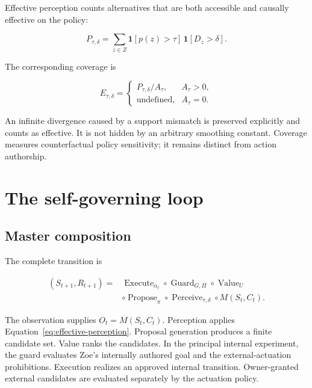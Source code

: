 \documentclass[11pt,a4paper]{article}
\begin{document}
Effective perception counts alternatives that are both accessible and causally effective on the policy:

\begin{equation}
P_{\tau,\delta}=\sum_{z\in Z}\mathbf 1[p(z)>\tau]\,\mathbf 1[D_z>\delta].
\label{eq:effective-perception}
\end{equation}

The corresponding coverage is

\begin{equation}
E_{\tau,\delta}=
\begin{cases}
P_{\tau,\delta}/A_\tau,&A_\tau>0,\\
\text{undefined},&A_\tau=0.
\end{cases}
\end{equation}

An infinite divergence caused by a support mismatch is preserved explicitly and counts as effective. It is not hidden by an arbitrary smoothing constant. Coverage measures counterfactual policy sensitivity; it remains distinct from action authorship.

\section{The self-governing loop}
\subsection{Master composition}
The complete transition is

\begin{equation}
\begin{split}
(S_{t+1},R_{t+1})
={}&\operatorname{Execute}_{\alpha_t}
\circ\operatorname{Guard}_{G,\Pi}
\circ\operatorname{Value}_{U}\\
&\circ\operatorname{Propose}_{\pi}
\circ\operatorname{Perceive}_{\tau,\delta}
\circ M(S_t,C_t).
\end{split}
\label{eq:master}
\end{equation}

The observation supplies $O_t=M(S_t,C_t)$. Perception applies Equation~\ref{eq:effective-perception}. Proposal generation produces a finite candidate set. Value ranks the candidates. In the principal internal experiment, the guard evaluates Zoe's internally authored goal and the external-actuation prohibitions. Execution realizes an approved internal transition. Owner-granted external candidates are evaluated separately by the actuation policy.
\end{document}
